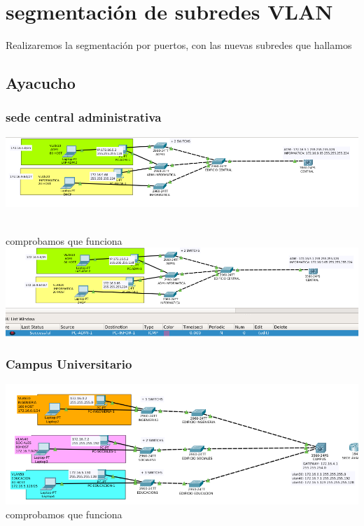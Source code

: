 \section{segmentaci\'on de subredes VLAN}

Realizaremos la segmentaci\'on por puertos, con las nuevas subredes que hallamos\\
\subsection{Ayacucho}

\subsubsection{sede central administrativa}
\includegraphics[scale=0.42]{img/vlancentral.png} 

\\comprobamos que funciona\\
\includegraphics[scale=0.45]{img/vlan100sucess.png} 
 
 \subsubsection{Campus Universitario}
\includegraphics[scale=0.45]{img/VLANCAMPUS.png} 
\\comprobamos que funciona\\

